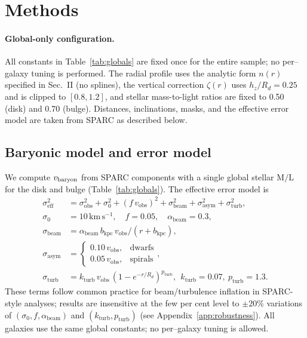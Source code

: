 \documentclass[twocolumn,prd,amsmath,amssymb,aps,superscriptaddress,nofootinbib]{revtex4-2}
\begin{document}
\section{Methods}
\paragraph*{Global-only configuration.} All constants in Table~\ref{tab:globals} are fixed once for the entire sample; no per--galaxy tuning is performed. The radial profile uses the analytic form $n(r)$ specified in Sec.~II (no splines), the vertical correction $\zeta(r)$ uses $h_z/R_d{=}0.25$ and is clipped to $[0.8,1.2]$, and stellar mass-to-light ratios are fixed to 0.50 (disk) and 0.70 (bulge). Distances, inclinations, masks, and the effective error model are taken from SPARC as described below.
\subsection{Baryonic model and error model}
We compute $v_{\rm baryon}$ from SPARC components with a single global stellar $\mathrm{M/L}$ for the disk and bulge (Table~\ref{tab:globals}). The effective error model is
\begin{align}
  \sigma_\mathrm{eff}^2 &= \sigma_\mathrm{obs}^2 + \sigma_0^2 + (f\,v_\mathrm{obs})^2 + \sigma_\mathrm{beam}^2 + \sigma_\mathrm{asym}^2 + \sigma_\mathrm{turb}^2,\\
  \sigma_0 &= 10\,\mathrm{km\,s^{-1}},\quad f = 0.05,\quad \alpha_\mathrm{beam}=0.3,\\
  \sigma_\mathrm{beam} &= \alpha_\mathrm{beam}\, b_\mathrm{kpc}\, v_\mathrm{obs}/(r+b_\mathrm{kpc}),\\
  \sigma_\mathrm{asym} &= \begin{cases}0.10\,v_\mathrm{obs}, & \text{dwarfs}\\ 0.05\,v_\mathrm{obs}, & \text{spirals}\end{cases},\\
  \sigma_\mathrm{turb} &= k_\mathrm{turb}\, v_\mathrm{obs}\,(1-e^{-r/R_d})^{p_\mathrm{turb}},\ \ k_\mathrm{turb}=0.07,\ p_\mathrm{turb}=1.3.
\end{align}
These terms follow common practice for beam/turbulence inflation in SPARC-style analyses; results are insensitive at the few per cent level to $\pm 20\%$ variations of $(\sigma_0, f, \alpha_\mathrm{beam})$ and $(k_\mathrm{turb}, p_\mathrm{turb})$ (see Appendix~\ref{app:robustness}). All galaxies use the same global constants; no per–galaxy tuning is allowed.
\end{document}
